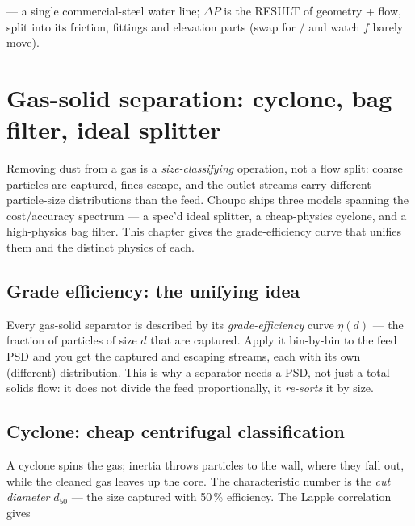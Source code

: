 \documentclass[11pt,a4paper]{article}
\begin{document}
\begin{tutoriallink}
 --- a single
commercial-steel water line; $\Delta P$ is the RESULT of geometry + flow,
split into its friction, fittings and elevation parts (swap  for  /  and watch $f$ barely
move).
\end{tutoriallink}

\section{Gas-solid separation: cyclone, bag filter, ideal
splitter}\label{ch:solids-sep}

\begin{whatyoulllearn}
Removing dust from a gas is a \emph{size-classifying} operation, not a
flow split: coarse particles are captured, fines escape, and the
outlet streams carry different particle-size distributions than the
feed.  Choupo ships three models spanning the cost/accuracy spectrum
--- a spec'd ideal splitter, a cheap-physics cyclone, and a
high-physics bag filter.  This chapter gives the grade-efficiency curve
that unifies them and the distinct physics of each.
\end{whatyoulllearn}

\subsection{Grade efficiency: the unifying idea}

Every gas-solid separator is described by its \emph{grade-efficiency}
curve $\eta(d)$ --- the fraction of particles of size $d$ that are
captured.  Apply it bin-by-bin to the feed PSD and you get the captured
and escaping streams, each with its own (different) distribution.  This
is why a separator needs a PSD, not just a total solids flow: it does
not divide the feed proportionally, it \emph{re-sorts} it by size.

\subsection{Cyclone: cheap centrifugal classification}

A cyclone spins the gas; inertia throws particles to the wall, where
they fall out, while the cleaned gas leaves up the core.  The
characteristic number is the \emph{cut diameter} $d_{50}$ --- the size
captured with 50\,\% efficiency.  The Lapple correlation gives
\end{document}
